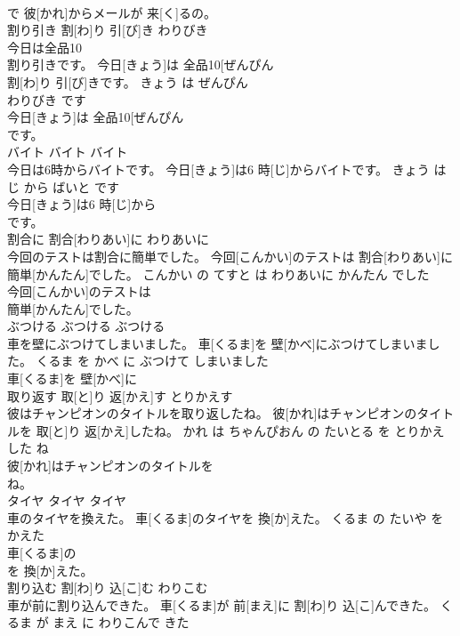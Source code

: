 \documentclass[8pt]{extreport}
\begin{document}
\begin{CJK}{UTF8}{min}
\\	で 彼[かれ]からメールが 来[く]るの。			
\\	割り引き	割[わ]り 引[び]き	わりびき	
\\	今日は全品10
\\	割り引きです。	今日[きょう]は 全品10[ぜんぴん 
\\	割[わ]り 引[び]きです。	きょう は ぜんぴん 
\\	わりびき です	
\\	今日[きょう]は 全品10[ぜんぴん 
\\	です。			
\\	バイト	バイト	バイト	
\\	今日は6時からバイトです。	今日[きょう]は6 時[じ]からバイトです。	きょう は 
\\	じ から ばいと です	
\\	今日[きょう]は6 時[じ]から
\\	です。			
\\	割合に	割合[わりあい]に	わりあいに	
\\	今回のテストは割合に簡単でした。	今回[こんかい]のテストは 割合[わりあい]に 簡単[かんたん]でした。	こんかい の てすと は わりあいに かんたん でした	
\\	今回[こんかい]のテストは
\\	簡単[かんたん]でした。			
\\	ぶつける	ぶつける	ぶつける	
\\	車を壁にぶつけてしまいました。	車[くるま]を 壁[かべ]にぶつけてしまいました。	くるま を かべ に ぶつけて しまいました	
\\	車[くるま]を 壁[かべ]に
\\	取り返す	取[と]り 返[かえ]す	とりかえす	
\\	彼はチャンピオンのタイトルを取り返したね。	彼[かれ]はチャンピオンのタイトルを 取[と]り 返[かえ]したね。	かれ は ちゃんぴおん の たいとる を とりかえした ね	
\\	彼[かれ]はチャンピオンのタイトルを
\\	ね。			
\\	タイヤ	タイヤ	タイヤ	
\\	車のタイヤを換えた。	車[くるま]のタイヤを 換[か]えた。	くるま の たいや を かえた	
\\	車[くるま]の
\\	を 換[か]えた。			
\\	割り込む	割[わ]り 込[こ]む	わりこむ	
\\	車が前に割り込んできた。	車[くるま]が 前[まえ]に 割[わ]り 込[こ]んできた。	くるま が まえ に わりこんで きた	

\end{CJK}
\end{document}
